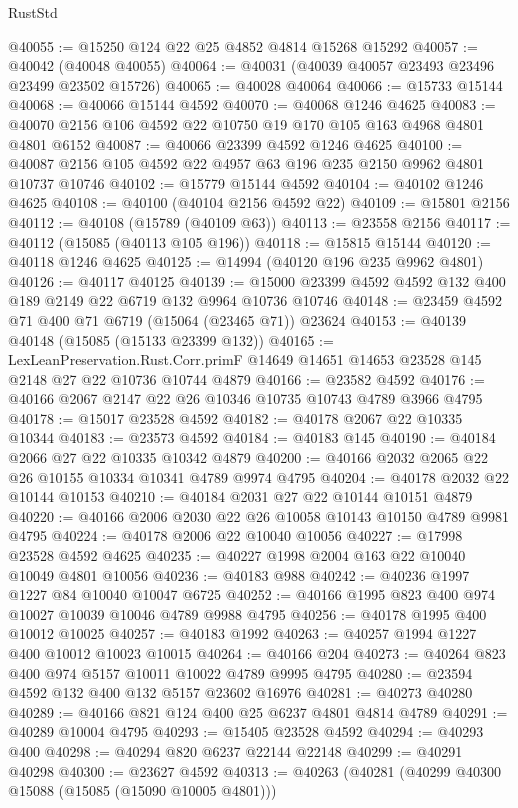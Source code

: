 \begin{lexlean}{RustStd}
\begin{coremodule}
@40055 := @15250 @124 @22 @25 @4852 @4814 @15268 @15292
@40057 := @40042 (@40048 @40055)
@40064 := @40031 (@40039 @40057 @23493 @23496 @23499 @23502 @15726)
@40065 := @40028 @40064
@40066 := @15733 @15144
@40068 := @40066 @15144 @4592
@40070 := @40068 @1246 @4625
@40083 := @40070 @2156 @106 @4592 @22 @10750 @19 @170 @105 @163 @4968 @4801 @4801 @6152
@40087 := @40066 @23399 @4592 @1246 @4625
@40100 := @40087 @2156 @105 @4592 @22 @4957 @63 @196 @235 @2150 @9962 @4801 @10737 @10746
@40102 := @15779 @15144 @4592
@40104 := @40102 @1246 @4625
@40108 := @40100 (@40104 @2156 @4592 @22)
@40109 := @15801 @2156
@40112 := @40108 (@15789 (@40109 @63))
@40113 := @23558 @2156
@40117 := @40112 (@15085 (@40113 @105 @196))
@40118 := @15815 @15144
@40120 := @40118 @1246 @4625
@40125 := @14994 (@40120 @196 @235 @9962 @4801)
@40126 := @40117 @40125
@40139 := @15000 @23399 @4592 @4592 @132 @400 @189 @2149 @22 @6719 @132 @9964 @10736 @10746
@40148 := @23459 @4592 @71 @400 @71 @6719 (@15064 (@23465 @71)) @23624
@40153 := @40139 @40148 (@15085 (@15133 @23399 @132))
@40165 := LexLeanPreservation.Rust.Corr.primF
    @14649
    @14651
    @14653
    @23528
    @145
    @2148
    @27
    @22
    @10736
    @10744
    @4879
@40166 := @23582 @4592
@40176 := @40166 @2067 @2147 @22 @26 @10346 @10735 @10743 @4789 @3966 @4795
@40178 := @15017 @23528 @4592
@40182 := @40178 @2067 @22 @10335 @10344
@40183 := @23573 @4592
@40184 := @40183 @145
@40190 := @40184 @2066 @27 @22 @10335 @10342 @4879
@40200 := @40166 @2032 @2065 @22 @26 @10155 @10334 @10341 @4789 @9974 @4795
@40204 := @40178 @2032 @22 @10144 @10153
@40210 := @40184 @2031 @27 @22 @10144 @10151 @4879
@40220 := @40166 @2006 @2030 @22 @26 @10058 @10143 @10150 @4789 @9981 @4795
@40224 := @40178 @2006 @22 @10040 @10056
@40227 := @17998 @23528 @4592 @4625
@40235 := @40227 @1998 @2004 @163 @22 @10040 @10049 @4801 @10056
@40236 := @40183 @988
@40242 := @40236 @1997 @1227 @84 @10040 @10047 @6725
@40252 := @40166 @1995 @823 @400 @974 @10027 @10039 @10046 @4789 @9988 @4795
@40256 := @40178 @1995 @400 @10012 @10025
@40257 := @40183 @1992
@40263 := @40257 @1994 @1227 @400 @10012 @10023 @10015
@40264 := @40166 @204
@40273 := @40264 @823 @400 @974 @5157 @10011 @10022 @4789 @9995 @4795
@40280 := @23594 @4592 @132 @400 @132 @5157 @23602 @16976
@40281 := @40273 @40280
@40289 := @40166 @821 @124 @400 @25 @6237 @4801 @4814 @4789
@40291 := @40289 @10004 @4795
@40293 := @15405 @23528 @4592
@40294 := @40293 @400
@40298 := @40294 @820 @6237 @22144 @22148
@40299 := @40291 @40298
@40300 := @23627 @4592
@40313 := @40263
    (@40281
      (@40299 @40300 @15088 (@15085 (@15090 @10005 @4801)))

\end{coremodule}
\end{lexlean}
